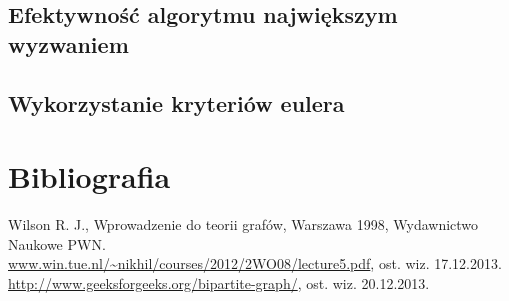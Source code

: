 \documentclass[a4 122pt]{article}
\begin{document}
	\subsection{Efektywność algorytmu największym wyzwaniem}
	\subsection{Wykorzystanie kryteriów eulera}

\section{Bibliografia}

		Wilson R. J., Wprowadzenie do teorii grafów, Warszawa 1998, Wydawnictwo Naukowe PWN.\\[0.3cm]
		\url{www.win.tue.nl/~nikhil/courses/2012/2WO08/lecture5.pdf}, ost. wiz. 17.12.2013.\\[0.3cm]
		\url{http://www.geeksforgeeks.org/bipartite-graph/}, ost. wiz. 20.12.2013.
\end{document}
